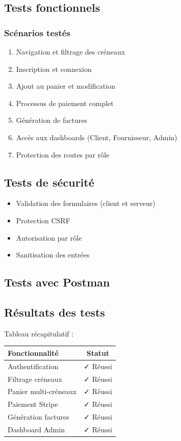 \documentclass[12pt,a4paper]{article}
\begin{document}
\subsection{Tests fonctionnels}
\subsubsection{Scénarios testés}
\begin{enumerate}
    \item Navigation et filtrage des créneaux
    \item Inscription et connexion
    \item Ajout au panier et modification
    \item Processus de paiement complet
    \item Génération de factures
    \item Accès aux dashboards (Client, Fournisseur, Admin)
    \item Protection des routes par rôle
\end{enumerate}

\subsection{Tests de sécurité}
\begin{itemize}
    \item Validation des formulaires (client et serveur)
    \item Protection CSRF
    \item Autorisation par rôle
    \item Sanitisation des entrées
\end{itemize}

\subsection{Tests avec Postman}

\subsection{Résultats des tests}
Tableau récapitulatif :

\begin{center}
\begin{tabular}{|l|c|}
\hline
\textbf{Fonctionnalité} & \textbf{Statut} \\
\hline
Authentification & ✓ Réussi \\
Filtrage créneaux & ✓ Réussi \\
Panier multi-créneaux & ✓ Réussi \\
Paiement Stripe & ✓ Réussi \\
Génération factures & ✓ Réussi \\
Dashboard Admin & ✓ Réussi \\
\hline
\end{tabular}
\end{center}
\end{document}
